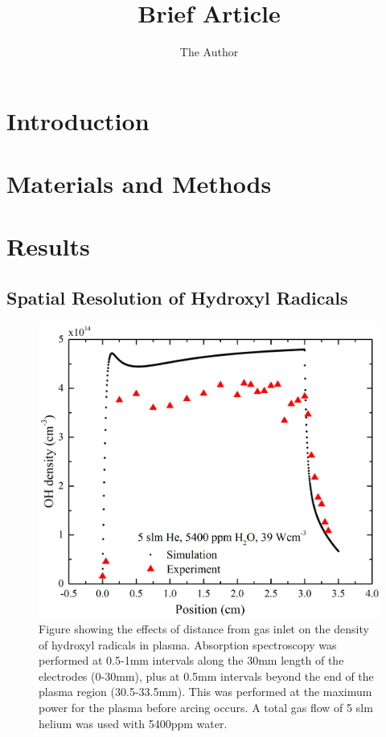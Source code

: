 \documentclass[11pt, oneside]{article}   	%
\title{Brief Article}
\author{The Author}
\begin{document}
\maketitle
\section{Introduction}
\section{Materials and Methods}

\section{Results}

\subsection{Spatial Resolution of Hydroxyl Radicals}

\begin{figure}
    \centering
    \includegraphics[width=\textwidth]{Figures/OHSpatialwithSim.jpg}
    \caption{Figure showing the effects of distance from gas inlet on the density of hydroxyl radicals in plasma. Absorption spectroscopy was performed at 0.5-1mm intervals along the 30mm length of the electrodes (0-30mm), plus at 0.5mm intervals beyond the end of the plasma region (30.5-33.5mm). This was performed at the maximum power for the plasma before arcing occurs. A total gas flow of 5 slm helium was used with 5400ppm water.}
    \label{fig:SpatialRes}
\end{figure}
\end{document}
